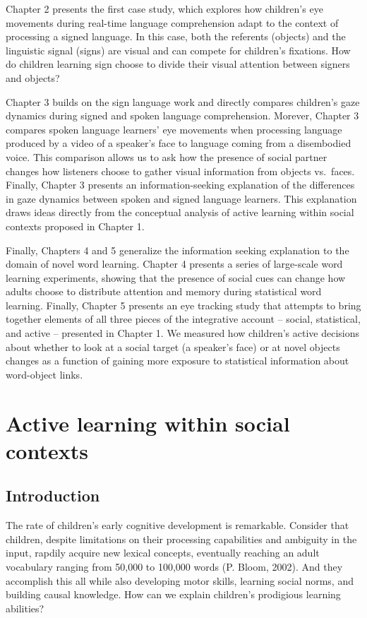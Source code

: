 \documentclass[oneside]{report}
\begin{document}
Chapter 2 presents the first case study, which explores how children's
eye movements during real-time language comprehension adapt to the
context of processing a signed language. In this case, both the
referents (objects) and the linguistic signal (signs) are visual and can
compete for children's fixations. How do children learning sign choose
to divide their visual attention between signers and objects?

Chapter 3 builds on the sign language work and directly compares
children's gaze dynamics during signed and spoken language
comprehension. Morever, Chapter 3 compares spoken language learners' eye
movements when processing language produced by a video of a speaker's
face to language coming from a disembodied voice. This comparison allows
us to ask how the presence of social partner changes how listeners
choose to gather visual information from objects vs.~faces. Finally,
Chapter 3 presents an information-seeking explanation of the differences
in gaze dynamics between spoken and signed language learners. This
explanation draws ideas directly from the conceptual analysis of active
learning within social contexts proposed in Chapter 1.

Finally, Chapters 4 and 5 generalize the information seeking explanation
to the domain of novel word learning. Chapter 4 presents a series of
large-scale word learning experiments, showing that the presence of
social cues can change how adults choose to distribute attention and
memory during statistical word learning. Finally, Chapter 5 presents an
eye tracking study that attempts to bring together elements of all three
pieces of the integrative account -- social, statistical, and active --
presented in Chapter 1. We measured how children's active decisions
about whether to look at a social target (a speaker's face) or at novel
objects changes as a function of gaining more exposure to statistical
information about word-object links.

\chapter{Active learning within social
contexts}\label{active-learning-within-social-contexts}

\section{Introduction}\label{introduction}

The rate of children's early cognitive development is remarkable.
Consider that children, despite limitations on their processing
capabilities and ambiguity in the input, rapdily acquire new lexical
concepts, eventually reaching an adult vocabulary ranging from 50,000 to
100,000 words (P. Bloom, 2002). And they accomplish this all while also
developing motor skills, learning social norms, and building causal
knowledge. How can we explain children's prodigious learning abilities?
\end{document}

